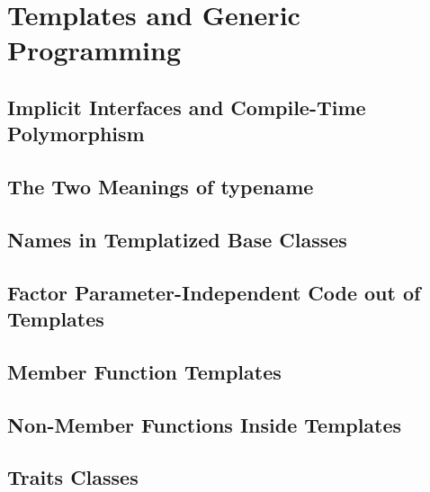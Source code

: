 \section{Templates and Generic Programming}\label{sec:templates}

\subsection{Implicit Interfaces and Compile-Time Polymorphism}

\subsection{The Two Meanings of typename}

\subsection{Names in Templatized Base Classes}

\subsection{Factor Parameter-Independent Code out of Templates}

\subsection{Member Function Templates}

\subsection{Non-Member Functions Inside Templates}

\subsection{Traits Classes}
